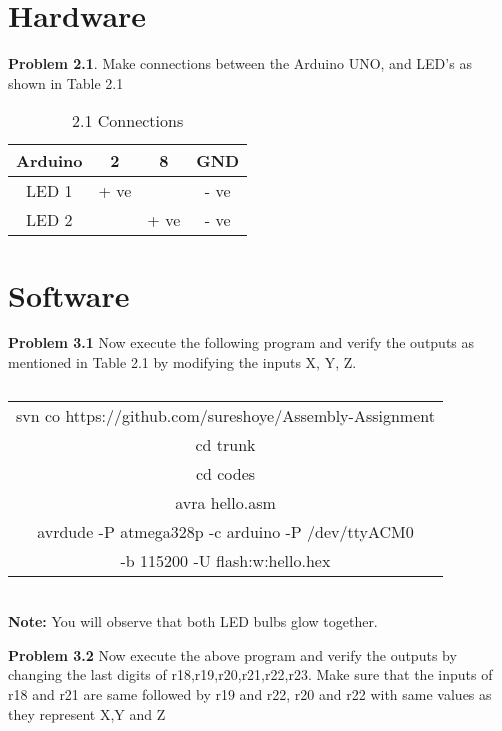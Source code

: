 \documentclass[journal,12pt,twocolumn]{IEEEtran}
\begin{document}
\section{Hardware}


\textbf{Problem 2.1}. Make connections between the Arduino UNO, and LED's as shown in Table 2.1 \\


\begin{table}[h]
    \centering
    \begin{tabular}{| c | c | c | c |}
        \hline
         Arduino & 2 & 8 & GND  \\
       \hline
       LED 1 & + ve &  & - ve  \\
        \hline
      LED 2 &  & + ve & - ve  \\
        \hline
         
         \hline
    \end{tabular}
    \caption{2.1 Connections}
\end{table}

\section{Software}

\textbf{Problem 3.1} Now execute the following program and verify the outputs as mentioned in Table 2.1 by modifying the inputs X, Y, Z.\\
\begin{table}[h]
    \centering
    \begin{tabular}{| c |}
    \hline
    svn co https://github.com/sureshoye/Assembly-Assignment\\
    	cd trunk \\

	cd codes \\
	
	avra hello.asm \\

	avrdude -P atmega328p -c arduino -P /dev/ttyACM0 \\-b 115200 -U flash:w:hello.hex\\
    
    \hline
    \end{tabular}
    \caption{}
    \label{}
 \end{table}
 \\
\textbf{Note:} You will observe that both LED bulbs glow together.

\textbf{Problem 3.2} Now execute the above program and verify the outputs by changing the last digits of r18,r19,r20,r21,r22,r23. Make sure that the inputs of r18 and r21 are same followed by r19 and r22, r20 and r22 with same values as they represent X,Y and Z \\
\end{document}
